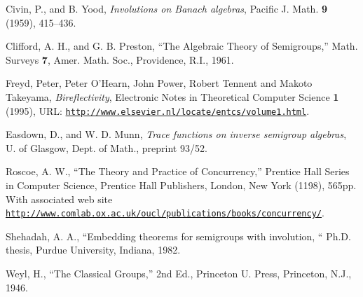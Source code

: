 \documentclass{entcs} \usepackage{entcsmacro}
\begin{document}
\begin{thebibliography}{10}\label{bibliography}
 Civin, P., and B. Yood, \emph{Involutions on Banach
    algebras}, Pacific J. Math. \textbf{9} (1959), 415--436.
  
 Clifford, A. H., and G. B. Preston, ``The Algebraic
  Theory of Semigroups,'' Math. Surveys \textbf{7}, Amer. Math. Soc.,
  Providence, R.I., 1961.
  
 Freyd, Peter, Peter O'Hearn, John Power, Robert Tennent
  and Makoto Takeyama, \emph{Bireflectivity}, Electronic Notes in
  Theoretical Computer Science {\bf 1} (1995), URL:
  \href{http://www.elsevier.nl/locate/entcs/volume1.html}
  {\texttt{http://www.elsevier.nl/locate/entcs/volume1.html}}.
  
 Easdown, D., and W. D. Munn, \emph{Trace functions on
    inverse semigroup algebras}, U. of Glasgow, Dept. of Math.,
  preprint 93/52.

 Roscoe, A. W., ``The Theory and Practice of Concurrency,''
  Prentice Hall Series in Computer Science, Prentice Hall Publishers,
  London, New York (1198), 565pp. With associated web site\\  
  \href{http://www.comlab.ox.ac.uk/oucl/publications/books/concurrency/}
  {\texttt{http://www.comlab.ox.ac.uk/oucl/publications/books/concurrency/}}.
  
 Shehadah, A. A., ``Embedding theorems for semigroups with
  involution, `` Ph.D.  thesis, Purdue University, Indiana, 1982.
  
 Weyl, H., ``The Classical Groups,'' 2nd Ed., Princeton U.
  Press, Princeton, N.J., 1946.

\end{thebibliography}
\end{document}
